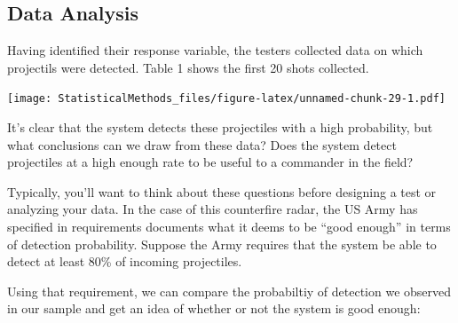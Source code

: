 \documentclass[
]{book}
\newenvironment{Shaded}{\begin{snugshade}}{\end{snugshade}}
\newcommand{\DecValTok}[1]{\textcolor[rgb]{0.00,0.00,0.81}{#1}}
\newcommand{\KeywordTok}[1]{\textcolor[rgb]{0.13,0.29,0.53}{\textbf{#1}}}
\newcommand{\NormalTok}[1]{#1}
\newcommand{\OperatorTok}[1]{\textcolor[rgb]{0.81,0.36,0.00}{\textbf{#1}}}
\newcommand{\StringTok}[1]{\textcolor[rgb]{0.31,0.60,0.02}{#1}}
\theoremstyle{definition}
\theoremstyle{definition}
\theoremstyle{definition}
\theoremstyle{remark}
\begin{document}
\hypertarget{data-analysis}{%
\subsection{Data Analysis}\label{data-analysis}}

Having identified their response variable, the testers collected data on which projectils were detected. Table 1 shows the first 20 shots collected.

\begin{Shaded}
\end{Shaded}

\texttt{[image: StatisticalMethods\_files/figure-latex/unnamed-chunk-29-1.pdf]}

It's clear that the system detects these projectiles with a high probability, but what conclusions can we draw from these data? Does the system detect projectiles at a high enough rate to be useful to a commander in the field?

Typically, you'll want to think about these questions before designing a test or analyzing your data. In the case of this counterfire radar, the US Army has specified in requirements documents what it deems to be ``good enough'' in terms of detection probability. Suppose the Army requires that the system be able to detect at least 80\% of incoming projectiles.

Using that requirement, we can compare the probabiltiy of detection we observed in our sample and get an idea of whether or not the system is good enough:

\begin{Shaded}
\end{Shaded}
\end{document}
